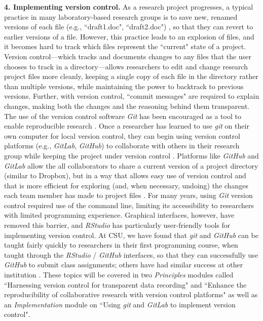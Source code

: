 \documentclass[pdftex,english,11pt,parskip=half]{scrartcl}
\begin{document}
\textbf{4. Implementing version control.} As a research project progresses, a typical practice in many laboratory-based research groups is to save new, renamed versions of each file (e.g., ``draft1.doc", ``draft2.doc") \cite{bryan2018excuse}, so that they can revert to earlier versions of a file. However, this practice leads to an explosion of files, and it becomes hard to track which files represent the ``current" state of a project. Version control---which tracks and documents changes to any files that the user chooses to track in a directory---allows researchers to edit and change research project files more cleanly, keeping a single copy of each file in the directory rather than multiple versions, while maintaining the power to backtrack to previous versions. Further, with version control, ``commit messages" are required to explain changes, making both the changes and the reasoning behind them transparent. The use of the version control software \textit{Git} has been encouraged as a tool to enable reproducible research \cite{piccolo2016tools, ram2013git, bryan2018excuse, lowndes2017our, cetinkaya2017infrastructure}. Once a researcher has learned to use \textit{git} on their own computer for local version control, they can begin using version control 
platforms (e.g., \textit{GitLab}, \textit{GitHub}) to collaborate with others in their research
group while keeping the project under version control \cite{bryan2018excuse, shade2015computing}. Platforms like \textit{GitHub} and \textit{GitLab} allow
the all collaborators to share a current version of a project directory 
(similar to Dropbox), but in a way that allows easy use of version control 
and that is more efficient for exploring (and, when necessary, undoing) the changes 
each team member has made to project files \cite{bryan2018excuse}. For many years, using \textit{Git} version control required use of the command line,
limiting its accessibility to researchers with limited programming experience.
Graphical interfaces, however, have removed this barrier, and \textit{RStudio} has 
particularly user-friendly tools for implementing version control. At CSU, we have found that \textit{git} and \textit{GitHub} can be taught fairly quickly to researchers in their first programming course, when taught through the \textit{RStudio} / \textit{GitHub} interfaces, so that they can successfully use \textit{GitHub} to submit class assignments; others have had similar success at other institution \cite{bryan2018excuse}. These
topics will be covered in two \textit{Principles} modules called ``Harnessing
version control for transparent data recording" and ``Enhance the
reproducibility of collaborative research with version control platforms" as
well as an \textit{Implementation} module on ``Using \textit{git} and \textit{GitLab} to implement
version control". 
\end{document}
